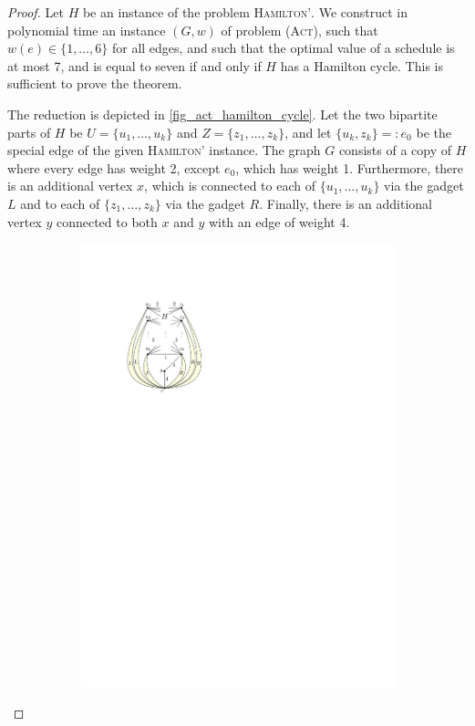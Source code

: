 \documentclass[runningheads]{llncs}
\numberwithin{equation}{section}
\newcommand{\set}[1]{\{ #1 \}}
\newcommand{\fromto}[2]{\set{#1, \ldots, #2}}
\newcommand{\act}{\textsc{(Act)}}
\begin{document}
\begin{proof}
Let $H$ be an instance of the problem \textsc{Hamilton'}. We construct in polynomial time an instance $(G, w)$ of problem {\act}, such that $w(e) \in \fromto{1}{6}$ for all edges, and such that the optimal value of a schedule is at most 7, and is equal to seven if and only if $H$ has a Hamilton cycle. This is sufficient to prove the theorem.

The reduction is depicted in \cref{fig_act_hamilton_cycle}. Let the two bipartite parts of $H$ be $U = \fromto{u_1}{u_k}$ and $Z = \fromto{z_1}{z_k}$, and let $\set{u_k, z_k} =: e_0$ be the special edge of the given \textsc{Hamilton'} instance. The graph $G$ consists of a copy of $H$ where every edge has weight 2, except $e_0$, which has weight 1. Furthermore, there is an additional vertex $x$, which is connected to each of $\fromto{u_1}{u_k}$ via the gadget $L$ and to each of $\fromto{z_1}{z_k}$ via the gadget $R$. Finally, there is an additional vertex $y$ connected to both $x$ and $y$ with an edge of weight 4.
\begin{figure}[htpb]
     \centering
     \begin{subfigure}[b]{0.4\textwidth}
         \centering
         \includegraphics[scale=1]{img/act-hamilton-cycle-a}

\end{subfigure}
\end{figure}
\end{proof}
\end{document}
